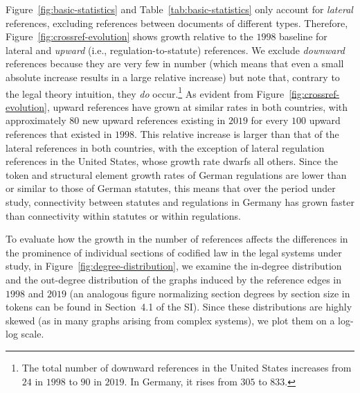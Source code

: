 \documentclass[utf8,sort&compress,table,hidelinks]{frontiersFPHY} %
\newcommand{\thesi}{SI\xspace}
\begin{document}
Figure~\ref{fig:basic-statistics} and Table~\ref{tab:basic-statistics} only account for \emph{lateral} references, excluding references between documents of different types. 
Therefore, Figure~\ref{fig:crossref-evolution} shows growth relative to the $1998$ baseline for lateral and \emph{upward} (i.e., regulation-to-statute) references. 
We exclude \emph{downward} references because they are very few in number (which means that even a small absolute increase results in a large relative increase) 
but note that, contrary to the legal theory intuition, they \emph{do} occur.\footnote{%
The total number of downward references in the United States increases from $24$ in $1998$ to $90$ in $2019$.
In Germany, it rises from $305$ to $833$.
}
As evident from Figure~\ref{fig:crossref-evolution}, upward references have grown at similar rates in both countries, with approximately $80$ new upward references existing in $2019$ for every $100$ upward references that existed in $1998$. 
This relative increase is larger than that of the lateral references in both countries, with the exception of lateral regulation references in the United States, whose growth rate dwarfs all others. 
Since the token and structural element growth rates of German regulations are lower than or similar to those of German statutes, this means that over the period under study, connectivity between statutes and regulations in Germany has grown faster than connectivity within statutes or within regulations. 

To evaluate how the growth in the number of references affects the differences in the prominence of individual sections of codified law in the legal systems under study, in Figure~\ref{fig:degree-distribution}, we examine the in-degree distribution and the out-degree distribution of the graphs induced by the reference edges in $1998$ and $2019$ (an analogous figure normalizing section degrees by section size in tokens can be found in Section~4.1 of the \thesi).  
Since these distributions are highly skewed (as in many graphs arising from complex systems), we plot them on a log-log scale. 
\end{document}
